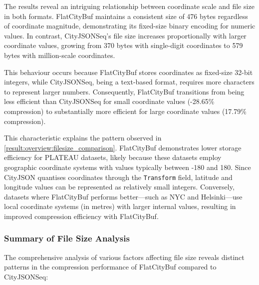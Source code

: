 The results reveal an intriguing relationship between coordinate scale and file size in both formats. FlatCityBuf maintains a consistent size of 476 bytes regardless of coordinate magnitude, demonstrating its fixed-size binary encoding for numeric values. In contrast, CityJSONSeq's file size increases proportionally with larger coordinate values, growing from 370 bytes with single-digit coordinates to 579 bytes with million-scale coordinates.

This behaviour occurs because FlatCityBuf stores coordinates as fixed-size 32-bit integers, while CityJSONSeq, being a text-based format, requires more characters to represent larger numbers. Consequently, FlatCityBuf transitions from being less efficient than CityJSONSeq for small coordinate values (-28.65\% compression) to substantially more efficient for large coordinate values (17.79\% compression).

This characteristic explains the pattern observed in \autoref{result:overview:filesize_comparison}. FlatCityBuf demonstrates lower storage efficiency for PLATEAU datasets, likely because these datasets employ geographic coordinate systems with values typically between -180 and 180. Since CityJSON quantises coordinates through the \texttt{Transform} field, latitude and longitude values can be represented as relatively small integers. Conversely, datasets where FlatCityBuf performs better—such as NYC and Helsinki—use local coordinate systems (in metres) with larger internal values, resulting in improved compression efficiency with FlatCityBuf.

\subsubsection{Summary of File Size Analysis}
\label{result:overview:analysis_of_file_size_results:summary}

The comprehensive analysis of various factors affecting file size reveals distinct patterns in the compression performance of FlatCityBuf compared to CityJSONSeq:

